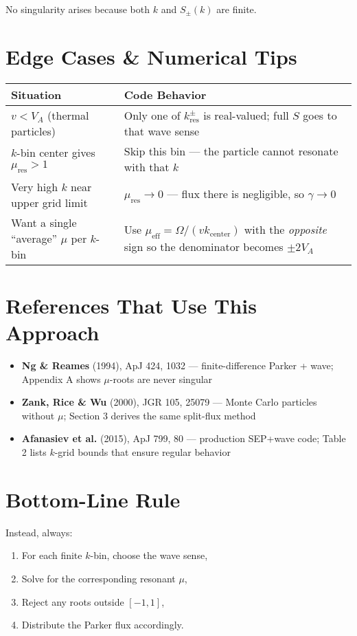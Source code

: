 No singularity arises because both $k$ and $S_\pm(k)$ are finite.

\section*{Edge Cases \& Numerical Tips}

\begin{center}
\begin{tabular}{p{6cm} p{9cm}}
\toprule
\textbf{Situation} & \textbf{Code Behavior} \\
\midrule
$v < V_A$ (thermal particles) & Only one of $k_{\text{res}}^\pm$ is real-valued; full $S$ goes to that wave sense \\
$k$-bin center gives $\mu_{\text{res}} > 1$ & Skip this bin — the particle cannot resonate with that $k$ \\
Very high $k$ near upper grid limit & $\mu_{\text{res}} \rightarrow 0$ — flux there is negligible, so $\gamma \rightarrow 0$ \\
Want a single ``average'' $\mu$ per $k$-bin & Use $\mu_{\text{eff}} = \Omega / (v k_{\text{center}})$ with the \emph{opposite} sign so the denominator becomes $\pm 2 V_A$ \\
\bottomrule
\end{tabular}
\end{center}

\section*{References That Use This Approach}

\begin{itemize}
    \item \textbf{Ng \& Reames} (1994), ApJ 424, 1032 — finite-difference Parker + wave; Appendix A shows $\mu$-roots are never singular
    \item \textbf{Zank, Rice \& Wu} (2000), JGR 105, 25079 — Monte Carlo particles without $\mu$; Section 3 derives the same split-flux method
    \item \textbf{Afanasiev et al.} (2015), ApJ 799, 80 — production SEP+wave code; Table 2 lists $k$-grid bounds that ensure regular behavior
\end{itemize}

\section*{Bottom-Line Rule}

\begin{tcolorbox}[colback=gray!10,title=Do Not Plug Eq.~(1) Into Eq.~(2) with the Same Sign]
Instead, always:
\begin{enumerate}
    \item For each finite $k$-bin, choose the wave sense,
    \item Solve for the corresponding resonant $\mu$,
    \item Reject any roots outside $[-1,1]$,
    \item Distribute the Parker flux accordingly.
\end{enumerate}
\end{tcolorbox}

